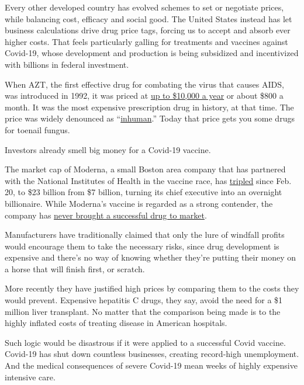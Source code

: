 Every other developed country has evolved schemes to set or negotiate
prices, while balancing cost, efficacy and social good. The United
States instead has let business calculations drive drug price tags,
forcing us to accept and absorb ever higher costs. That feels
particularly galling for treatments and vaccines against Covid-19, whose
development and production is being subsidized and incentivized with
billions in federal investment.

When AZT, the first effective drug for combating the virus that causes
AIDS, was introduced in 1992, it was priced at
\href{https://www.nytimes3xbfgragh.onion/1987/03/21/us/us-approves-drug-to-prolong-lives-of-aids-patients.html}{up
to \$10,000 a year} or about \$800 a month. It was the most expensive
prescription drug in history, at that time. The price was widely
denounced as
``\href{https://www.nytimes3xbfgragh.onion/1989/08/28/opinion/azt-s-inhuman-cost.html\#:~:text=At\%20\%248\%2C000\%20a\%20year\%20for,program\%20that\%20ends\%20in\%20September.}{inhuman}.''
Today that price gets you some drugs for toenail fungus.

Investors already smell big money for a Covid-19 vaccine.

The market cap of Moderna, a small Boston area company that has
partnered with the National Institutes of Health in the vaccine race,
has \href{https://ycharts.com/companies/MRNA/market_cap}{tripled} since
Feb. 20, to \$23 billion from \$7 billion, turning its chief executive
into an overnight billionaire. While Moderna's vaccine is regarded as a
strong contender, the company has
\href{https://www.wsj.com/articles/inside-moderna-the-covid-vaccine-front-runner-with-no-track-record-and-an-unsparing-ceo-11593615205}{never
brought a successful drug to market}.

Manufacturers have traditionally claimed that only the lure of windfall
profits would encourage them to take the necessary risks, since drug
development is expensive and there's no way of knowing whether they're
putting their money on a horse that will finish first, or scratch.

More recently they have justified high prices by comparing them to the
costs they would prevent. Expensive hepatitis C drugs, they say, avoid
the need for a \$1 million liver transplant. No matter that the
comparison being made is to the highly inflated costs of treating
disease in American hospitals.

Such logic would be disastrous if it were applied to a successful Covid
vaccine. Covid-19 has shut down countless businesses, creating
record-high unemployment. And the medical consequences of severe
Covid-19 mean weeks of highly expensive intensive care.

